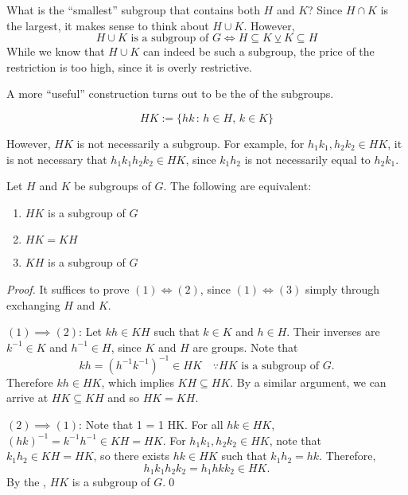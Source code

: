 What is the ``smallest'' subgroup that contains both $H$ and $K$? Since $H \cap K$ is the largest, it makes sense to think about $H \cup K$. However,
\begin{equation*}
  H \cup K \text{ is a subgroup of } G \iff H \subseteq K \veebar K \subseteq H
\end{equation*}
While we know that $H \cup K$ can indeed be such a subgroup, the price of the restriction is too high, since it is overly restrictive.

A more ``useful'' construction turns out to be the  of the subgroups.

\begin{defn}
\label{defn:product_of_groups}
  \begin{equation*}
    HK := \{ hk \, : \, h \in H, \, k \in K \}
  \end{equation*}
\end{defn}

However, $HK$ is not necessarily a subgroup. For example, for $h_1 k_1, h_2 k_2 \in HK$, it is not necessary that $h_1 k_1 h_2 k_2 \in HK$, since $k_1 h_2$ is not necessarily equal to $h_2 k_1$.

\begin{lemma}
\label{lemma:product_of_groups_as_a_subgroup}
  Let $H$ and $K$ be subgroups of $G$. The following are equivalent:
  \begin{enumerate}
    \item $HK$ is a subgroup of $G$
    \item $HK = KH$ 
    \item $KH$ is a subgroup of $G$
  \end{enumerate}
\end{lemma}

\begin{proof}
  It suffices to prove $(1) \iff (2)$, since $(1) \iff (3)$ simply through exchanging $H$ and $K$.

  \noindent $(1) \implies (2)$: Let $kh \in KH$ such that $k \in K$ and $h \in H$. Their inverses are $k^{-1} \in K$ and $h^{-1} \in H$, since $K$ and $H$ are groups. Note that
  \begin{equation*}
    kh = (h^{-1} k^{-1})^{-1} \in HK \quad \because HK \text{ is a subgroup of } G.
  \end{equation*}
  Therefore $kh \in HK$, which implies $KH \subseteq HK$. By a similar argument, we can arrive at $HK \subseteq KH$ and so $HK = KH$.

  \noindent $(2) \implies (1)$: Note that 1 = 1  \in HK. For all $hk \in HK$, $(hk)^{-1} = k^{-1} h^{-1} \in KH = HK$. For $h_1 k_1, h_2 k_2 \in HK$, note that $k_1 h_2 \in KH = HK$, so there exists $h k \in HK$ such that $k_1 h_2 = hk$. Therefore,
  \begin{equation*}
    h_1 k_1 h_2 k_2 = h_1 h k k_2 \in HK.
  \end{equation*}
  By the , $HK$ is a subgroup of $G$.\qed
\end{proof}


